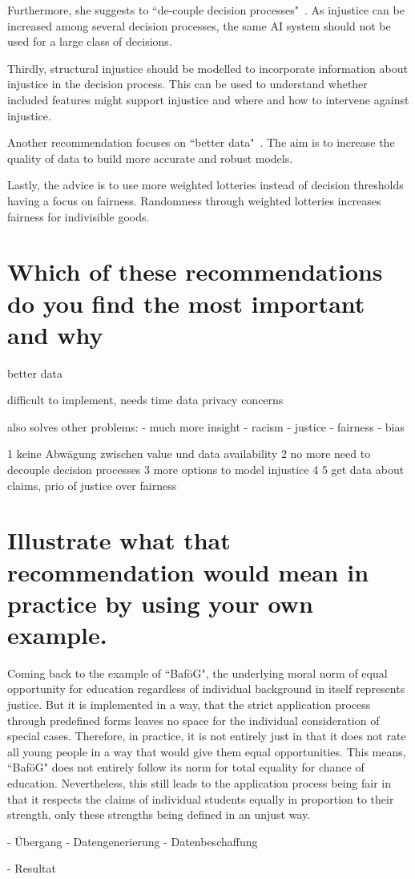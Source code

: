 Furthermore, she suggests to ``de-couple decision processes"~\parencite[][22]{vredenburgh}.
As injustice can be increased among several decision processes, the same AI system should not be used for a large class of decisions.

Thirdly, structural injustice should be modelled to incorporate information about injustice in the decision process.
This can be used to understand whether included features might support injustice and where and how to intervene against injustice.

Another recommendation focuses on ``better data"~\parencite[][24]{vredenburgh}.
The aim is to increase the quality of data to build more accurate and robust models.

Lastly, the advice is to use more weighted lotteries instead of decision thresholds having a focus on fairness.
Randomness through weighted lotteries increases fairness for indivisible goods.

\section*{Which of these recommendations do you find the most important and why}

better data


difficult to implement, needs time
data privacy concerns


also solves other problems:
- much more insight
  - racism
  - justice
  - fairness
  - bias


1 keine Abwägung zwischen value und data availability
2 no more need to decouple decision processes
3 more options to model injustice
4
5 get data about claims, prio of justice over fairness




\section*{Illustrate what that recommendation would mean in practice by using your own example.}

Coming back to the example of ``BaföG", the underlying moral norm of equal opportunity for education regardless of individual background in itself represents justice.
But it is implemented in a way, that the strict application process through predefined forms leaves no space for the individual consideration of special cases.
Therefore, in practice, it is not entirely just in that it does not rate all young people in a way that would give them equal opportunities.
This means, ``BaföG" does not entirely follow its norm for total equality for chance of education.
Nevertheless, this still leads to the application process being fair in that it respects the claims of individual students equally in proportion to their strength, only these strengths being defined in an unjust way.

- Übergang
  - Datengenerierung
  - Datenbeschaffung

- Resultat

